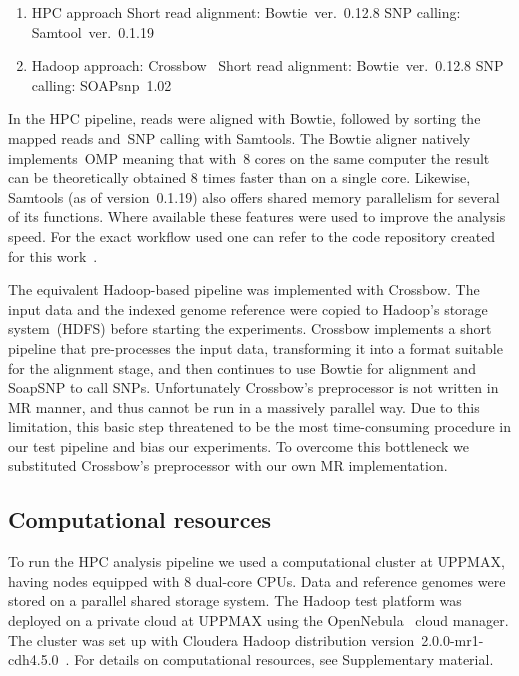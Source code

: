 \documentclass[11pt, oneside]{article}   	%
\begin{document}
\begin{enumerate}
\item HPC approach
\subitem Short read alignment: Bowtie~ver.~0.12.8
\subitem SNP calling: Samtool~ver.~0.1.19
\item Hadoop approach: Crossbow~\cite{crossbow}
\subitem Short read alignment: Bowtie~ver.~0.12.8
\subitem SNP calling: SOAPsnp~1.02~\cite{soapsnp}
\end{enumerate}


In the HPC pipeline, reads were aligned with Bowtie, followed by sorting the mapped reads and~SNP calling with Samtools. The Bowtie aligner natively implements~OMP meaning that with~8 cores on the same computer the result can be theoretically obtained 8 times faster than on a single core. Likewise, Samtools (as of version~0.1.19) also offers shared memory parallelism for several of its functions. Where available these features were used to improve the analysis speed. For the exact workflow used one can refer to the code repository created for this work~\cite{code_repo}.

The equivalent Hadoop-based pipeline was implemented with Crossbow. The input data and the indexed genome reference were copied to Hadoop's storage system~(HDFS) before starting the experiments. Crossbow implements a short pipeline that pre-processes the input data, transforming it into a format suitable for the alignment stage, and then continues to use Bowtie for alignment and SoapSNP to call SNPs.  Unfortunately Crossbow's preprocessor is not written in MR manner, and thus cannot be run in a massively parallel way. Due to this limitation, this basic step threatened to be the most time-consuming procedure in our test pipeline and bias our experiments. To overcome this bottleneck we substituted Crossbow's preprocessor with our own MR implementation.



\subsection{Computational resources}
To run the HPC analysis pipeline we used a computational cluster at UPPMAX, having nodes equipped with 8 dual-core CPUs. Data and reference genomes were stored on a parallel shared storage system\cite{gulo}. The Hadoop test platform was deployed on a private cloud at UPPMAX using the OpenNebula~\cite{opennebula} cloud manager. The cluster was set up with Cloudera Hadoop distribution version~2.0.0-mr1-cdh4.5.0~\cite{cloudera}. For details on computational resources, see Supplementary material.
\end{document}
